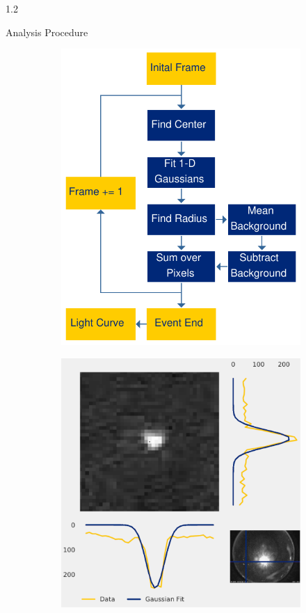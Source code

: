\documentclass[final]{beamer}
\newlength{\twocolwid}
\begin{document}
\begin{frame}[t]
\begin{columns}[t]
\begin{column}{1.2\twocolwid}
\begin{alertblock}{Analysis Procedure}
\begin{figure}
\centering
\begin{subfigure}{.5\textwidth}
  \centering
  \includegraphics[width=\linewidth]{flowchart1.pdf}
  \label{fig:flowchart}
\end{subfigure}%
\begin{subfigure}{.5\textwidth}
  \centering
  \includegraphics[width=\linewidth]{testplot1.pdf}

\end{subfigure}
\end{figure}
\end{alertblock}
\end{column}
\end{columns}
\end{frame}
\end{document}
